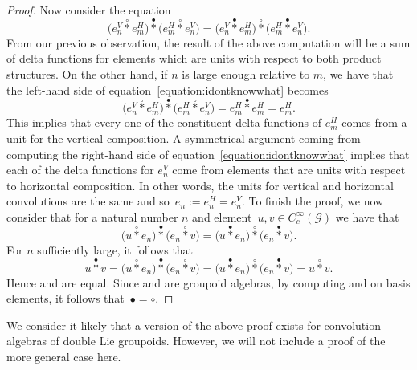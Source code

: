 \documentclass[10pt,a4paper]{amsart}
\numberwithin{equation}{section}
\theoremstyle{definition}
\newcommand{\CG}{\mathcal{G}}
\newcommand{\stardot}{\overset{{\bullet}}{*}}
\newcommand{\starcirc}{\overset{\circ}{*}}
\begin{document}
\begin{proof}
Now consider the equation
\begin{equation}\label{equation:idontknowwhat}
\big(e_n^V \starcirc e_m^H\big) \stardot \big( e_m^H \starcirc e^V_n\big)  = \big(e_n^V \stardot e_m^H\big) \starcirc \big( e_m^H \stardot e^V_n\big).
\end{equation}
From our previous observation, the result of the above computation will be a sum of delta functions for elements which are units with respect to both product structures. On the other hand, if $ n $ is large enough relative to $m$, we have that the left-hand side of equation~\eqref{equation:idontknowwhat} becomes
\[
\big(e_n^V \starcirc e_m^H\big) \stardot \big( e_m^H \starcirc e^V_n\big) = e_m^H \stardot e^H_m = e^H_m.
\]
This implies that every one of the constituent delta functions of $ e^H_m $ comes from a unit for the vertical composition. A symmetrical argument coming from computing the right-hand side of equation~\eqref{equation:idontknowwhat} implies that each of the delta functions for $ e^V_n $ come from elements that are units with respect to horizontal composition. In other words, the units for vertical and horizontal convolutions are the same and so~${e_n := e^H_n = e^V_n}$.
To finish the proof, we now consider that for a natural number $ n $ and element~${u,v \in C_c^\infty(\CG)}$ we have that
\[
\big(u \starcirc e_n\big) \stardot \big(e_n \starcirc v\big)  = \big(u \stardot e_n \big) \starcirc \big( e_n \stardot v\big).
\]
For $ n $ sufficiently large, it follows that
\[ u \stardot v = \big(u \starcirc e_n\big) \stardot \big(e_n \starcirc v\big)  = \big(u \stardot e_n \big) \starcirc \big( e_n \stardot v\big) = u \starcirc v.
\]
Hence \smash{$ \stardot$} and \smash{$ \starcirc$} are equal. Since \smash{$ \starcirc $} and \smash{$ \stardot $} are groupoid algebras, by computing \smash{$ \starcirc $} and \smash{$ \stardot $} on basis elements, it follows that~${\bullet = \circ}$.
\end{proof}

We consider it likely that a version of the above proof exists for convolution algebras of double Lie groupoids. However, we will not include a proof of the more general case here.
\end{document}
